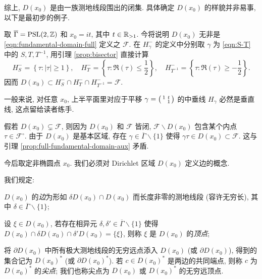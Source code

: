 综上, $D(x_0)$ 是由一族测地线段围出的闭集. 具体确定 $D(x_0)$ 的样貌并非易事, 以下是最初步的例子.
\begin{example}\label{eg:Dirichlet-domain-full}
	取 $\overline{\Gamma} = \operatorname{PSL}(2,\mathbb{Z})$ 和 $x_0 = it$, 其中 $t \in \mathbb{R}_{> 1}$. 今将说明 $D(x_0)$ 无非是 \eqref{eqn:fundamental-domain-full} 定义之 $\mathcal{F}$. 在 $H_\gamma^-$ 的定义中分别取 $\gamma$ 为 \eqref{eqn:S-T} 中的 $S, T, T^{-1}$, 用引理 \ref{prop:bisector} 直接计算
	\begin{equation*}
		H_S^- = \left\{ \tau : |\tau| \geq 1 \right\}, \quad H_T^- = \left\{ \tau : \Re(\tau) \leq \frac{1}{2} \right\}, \quad H_{T^{-1}}^- = \left\{ \tau : \Re(\tau) \geq -\frac{1}{2} \right\}.
	\end{equation*}
	因而 $D(x_0) \subset H_S^- \cap H_T^- \cap H_{T^{-1}}^- = \mathcal{F}$.

	一般来说, 对任意 $x_0$, 上半平面里对应于平移 $\gamma = \bigl(\begin{smallmatrix} 1 & t \\  & 1 \end{smallmatrix}\bigr)$ 的中垂线 $H_\gamma$ 必然是垂直线, 这点留给读者练手.
	
	假若 $D(x_0) \subsetneq \mathcal{F}$, 则因为 $D(x_0)$ 和 $\mathcal{F}$ 皆闭, $\mathcal{F} \smallsetminus D(x_0)$ 包含某个内点 $\tau \in \mathcal{F}^\circ$. 由于 $D(x_0)$ 是基本区域, 存在 $\gamma \in \overline{\Gamma} \smallsetminus \{1\}$ 使得 $\gamma\tau \in D(x_0) \subset \mathcal{F}$. 这与引理 \ref{prop:full-fundamental-domain-aux} 矛盾.
\end{example}

今后取定非椭圆点 $x_0$. 我们必须对 Dirichlet 区域 $D(x_0)$ 定义边的概念.
\begin{definition}[边, 顶点, 尖点]\label{def:sides}   
	我们规定:
	\begin{compactitem}
		\item $D(x_0)$ 的\emph{边}为形如 $\delta D(x_0) \cap D(x_0)$ 而长度非零的测地线段 (容许无穷长), 其中 $\delta \in \overline{\Gamma} \smallsetminus \{1\}$;
		\item 设 $\xi \in D(x_0)$, 若存在相异元 $\delta, \delta' \in \overline{\Gamma} \smallsetminus \{1\}$ 使得 $D(x_0) \cap \delta D(x_0) \cap \delta' D(x_0) = \{\xi\}$, 则称 $\xi$ 是 $D(x_0)$ 的\emph{顶点};
		\item 将 $\partial D(x_0)$ 中所有极大测地线段的无穷远点添入 $D(x_0)$ (或 $\partial D(x_0)$), 得到的集合记为 $D(x_0)^*$ (或 $\partial D(x_0)^*$). 若 $c \in D(x_0)^*$ 是两边的共同端点, 则称 $c$ 为 $D(x_0)^*$ 的\emph{尖点}; 我们也称尖点为 $D(x_0)$ 或 $D(x_0)^*$ 的无穷远顶点.
	\end{compactitem}
\end{definition}

